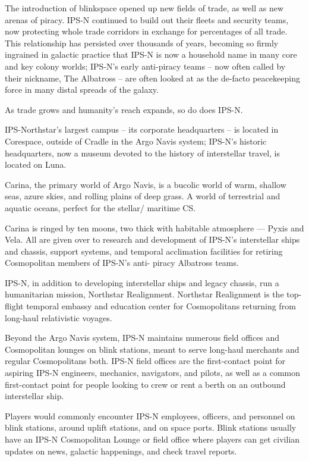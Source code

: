 The introduction of blinkspace opened up new fields of trade, as well as new arenas of piracy.
IPS-N continued to build out their fleets and security teams, now protecting whole trade corridors
in exchange for percentages of all trade. This relationship has persisted over thousands of years,
becoming so firmly ingrained in galactic practice that IPS-N is now a household name in many
core and key colony worlds; IPS-N’s early anti-piracy teams -- now often called by their nickname,
The Albatross -- are often looked at as the de-facto peacekeeping force in many distal spreads of
the galaxy.




As trade grows and humanity’s reach expands, so do does IPS-N.

IPS-Northstar’s largest campus -- its corporate headquarters -- is located in Corespace, outside
of Cradle in the Argo Navis system; IPS-N’s historic headquarters, now a museum devoted to the
history of interstellar travel, is located on Luna.


Carina, the primary world of Argo Navis, is a bucolic world of warm, shallow seas, azure skies,
and rolling plains of deep grass. A world of terrestrial and aquatic oceans, perfect for the stellar/
maritime CS.


Carina is ringed by ten moons, two thick with habitable atmosphere — Pyxis and Vela. All are
given over to research and development of IPS-N’s interstellar ships and chassis, support
systems, and temporal acclimation facilities for retiring Cosmopolitan members of IPS-N’s anti-
piracy Albatross teams.


IPS-N, in addition to developing interstellar ships and legacy chassis, run a humanitarian
mission, Northstar Realignment. Northstar Realignment is the top-flight temporal embassy and
education center for Cosmopolitans returning from long-haul relativistic voyages.


Beyond the Argo Navis system, IPS-N maintains numerous field offices and Cosmopolitan
lounges on blink stations, meant to serve long-haul merchants and regular Cosmopolitans both.
IPS-N field offices are the first-contact point for aspiring IPS-N engineers, mechanics,
navigators, and pilots, as well as a common first-contact point for people looking to crew or rent
a berth on an outbound interstellar ship.


Players would commonly encounter IPS-N employees, officers, and personnel on blink stations,
around uplift stations, and on space ports. Blink stations usually have an IPS-N Cosmopolitan
Lounge or field office where players can get civilian updates on news, galactic happenings, and
check travel reports.


